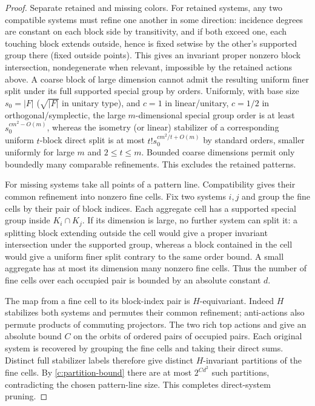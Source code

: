 \begin{proof}
Separate retained and missing colors. For retained systems, any two compatible systems must refine one another in some direction: incidence degrees are constant on each block side by transitivity, and if both exceed one, each touching block extends outside, hence is fixed setwise by the other's supported group there (fixed outside points). This gives an invariant proper nonzero block intersection, nondegenerate when relevant, impossible by the retained actions above. A coarse block of large dimension cannot admit the resulting uniform finer split under its full supported special group by orders. Uniformly, with base size \(s_0=|F|\) (\(\sqrt{|F|}\) in unitary type), and \(c=1\) in linear/unitary, \(c=1/2\) in orthogonal/symplectic, the large \(m\)-dimensional special group order is at least \(s_0^{c m^2-O(m)}\), whereas the isometry (or linear) stabilizer of a corresponding uniform \(t\)-block direct split is at most \(t!s_0^{c m^2/t+O(m)}\) by standard orders, smaller uniformly for large \(m\) and \(2\le t\le m\). Bounded coarse dimensions permit only boundedly many comparable refinements. This excludes the retained patterns.

For missing systems take all points of a pattern line. Compatibility
gives their common refinement into nonzero fine cells. Fix two systems
$i,j$ and group the fine cells by their pair of block indices. Each
aggregate cell has a supported special group inside $K_i\cap K_j$.
If its dimension is large, no further system can split it: a splitting
block extending outside the cell would give a proper invariant
intersection under the supported group, whereas a block contained in
the cell would give a uniform finer split contrary to the same order
bound. A small aggregate has at most its dimension many nonzero fine
cells. Thus the number of fine cells over each occupied pair is bounded
by an absolute constant $d$.

The map from a fine cell to its block-index pair is $H$-equivariant.
Indeed $H$ stabilizes both systems and permutes their common refinement;
anti-actions also permute products of commuting projectors. The two rich
top actions and  give an absolute bound $C$ on the
orbits of ordered pairs of occupied pairs. Each original system is
recovered by grouping the fine cells and taking their direct sums.
Distinct full stabilizer labels therefore give distinct $H$-invariant
partitions of the fine cells. By \eqref{c:partition-bound} there are at
most $2^{Cd^2}$ such partitions, contradicting the chosen pattern-line
size. This completes direct-system pruning.
\end{proof}

